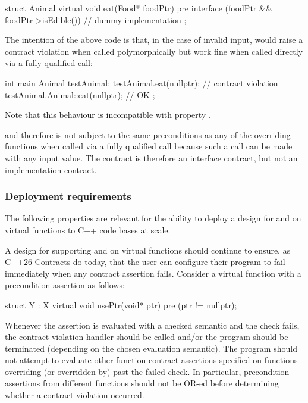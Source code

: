 \begin{codeblock}
struct Animal {
  virtual void eat(Food* foodPtr)
    pre interface (foodPtr && foodPtr->isEdible()) {
      // dummy implementation
    }
};
\end{codeblock}

The intention of the above code is that, in the case of invalid input,  would raise a contract violation when called polymorphically but work fine when called directly via a fully qualified call:
\begin{codeblock}
int main {
  Animal testAnimal;
  testAnimal.eat(nullptr);  // contract violation
  testAnimal.Animal::eat(nullptr); // OK
};
\end{codeblock}

Note that this behaviour is incompatible with property .

 and therefore is not subject to the same
preconditions as any of the overriding functions when called via a fully qualified call because such a
call can be made with any input value. The contract is therefore an interface contract, but not an
implementation contract.


\subsubsection{Deployment requirements}

The following properties are relevant for the ability to deploy a design for  and  on virtual functions to C++ code bases at scale.


A design for supporting  and  on virtual functions should continue to ensure, as C++26 Contracts do today, that the user can configure their program to fail immediately when any contract assertion fails. Consider a virtual function with a precondition assertion as follows:
\begin{codeblock}
struct Y : X {
  virtual void usePtr(void* ptr) 
    pre (ptr != nullptr);
}
\end{codeblock}
Whenever the assertion \mbox{} is evaluated with a checked semantic and the check fails, the contract-violation handler should be called and/or the program should be terminated (depending on the chosen evaluation semantic). The program should not attempt to evaluate other function contract assertions specified on functions overriding (or overridden by)  past the failed check. In particular, precondition assertions from different functions should not be OR-ed before determining whether a contract violation occurred.

